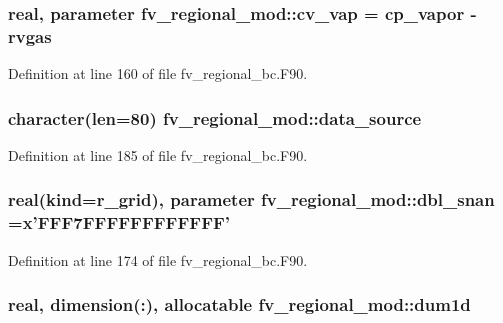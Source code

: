 \subsubsection[{cv\-\_\-vap}]{\setlength{\rightskip}{0pt plus 5cm}real, parameter fv\-\_\-regional\-\_\-mod\-::cv\-\_\-vap = cp\-\_\-vapor -\/ rvgas\hspace{0.3cm}{\ttfamily [private]}}\label{classfv__regional__mod_af441421c2c1bc6465e3552693aed3a0f}


Definition at line 160 of file fv\-\_\-regional\-\_\-bc.\-F90.

\subsubsection[{data\-\_\-source}]{\setlength{\rightskip}{0pt plus 5cm}character(len=80) fv\-\_\-regional\-\_\-mod\-::data\-\_\-source\hspace{0.3cm}{\ttfamily [private]}}\label{classfv__regional__mod_a390d0696d4ec8ca340b2fc69213e16e8}


Definition at line 185 of file fv\-\_\-regional\-\_\-bc.\-F90.

\subsubsection[{dbl\-\_\-snan}]{\setlength{\rightskip}{0pt plus 5cm}real(kind=r\-\_\-grid), parameter fv\-\_\-regional\-\_\-mod\-::dbl\-\_\-snan =x'F\-F\-F7\-F\-F\-F\-F\-F\-F\-F\-F\-F\-F\-F\-F'\hspace{0.3cm}{\ttfamily [private]}}\label{classfv__regional__mod_afb97c724dfbe30f087907a7a7f1eaf44}


Definition at line 174 of file fv\-\_\-regional\-\_\-bc.\-F90.

\subsubsection[{dum1d}]{\setlength{\rightskip}{0pt plus 5cm}real, dimension(\-:), allocatable fv\-\_\-regional\-\_\-mod\-::dum1d\hspace{0.3cm}{\ttfamily [private]}}\label{classfv__regional__mod_a5616e5b4b06f6c406824fa679fa0fd9e}


